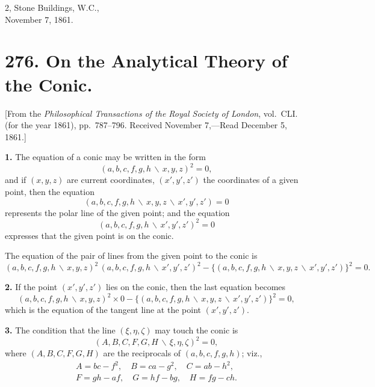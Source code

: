\documentclass[11pt,a4paper]{article}
\theoremstyle{definition}
\begin{document}
\begin{flushright}
2, Stone Buildings, W.C.,\\
November 7, 1861.
\end{flushright}

\newpage
\section*{276. On the Analytical Theory of the Conic.}

[From the \textit{Philosophical Transactions of the Royal Society of London},
vol.~CLI. (for the year 1861), pp.~787--796.
Received November 7,---Read December 5, 1861.]
\vspace{0.5em}

\textbf{1.} The equation of a conic may be written in the form
\[(a,b,c,f,g,h\,\backslash\!\!\,x,y,z)^{2} = 0,\]
and if $(x,y,z)$ are current coordinates, $(x',y',z')$ the coordinates of a given point,
then the equation
\[(a,b,c,f,g,h\,\backslash\!\!\,x,y,z\,\backslash\!\!\,x',y',z') = 0\]
represents the polar line of the given point; and the equation
\[(a,b,c,f,g,h\,\backslash\!\!\,x',y',z')^{2} = 0\]
expresses that the given point is on the conic.

The equation of the pair of lines from the given point to the conic is
\[(a,b,c,f,g,h\,\backslash\!\!\,x,y,z)^{2}\,(a,b,c,f,g,h\,\backslash\!\!\,x',y',z')^{2}
- \{(a,b,c,f,g,h\,\backslash\!\!\,x,y,z\,\backslash\!\!\,x',y',z')\}^{2} = 0.\]

\textbf{2.} If the point $(x',y',z')$ lies on the conic, then the last equation becomes
\[(a,b,c,f,g,h\,\backslash\!\!\,x,y,z)^{2}\times 0 - \{(a,b,c,f,g,h\,\backslash\!\!\,x,y,z\,\backslash\!\!\,x',y',z')\}^{2} = 0,\]
which is the equation of the tangent line at the point $(x',y',z')$.

\textbf{3.} The condition that the line $(\xi,\eta,\zeta)$ may touch the conic is
\[(A,B,C,F,G,H\,\backslash\!\!\,\xi,\eta,\zeta)^{2} = 0,\]
where $(A,B,C,F,G,H)$ are the reciprocals of $(a,b,c,f,g,h)$; viz.,
\begin{gather*}
A = bc-f^{2}, \quad B = ca-g^{2}, \quad C = ab-h^{2},\\
F = gh-af, \quad G = hf-bg, \quad H = fg-ch.
\end{gather*}
\end{document}
